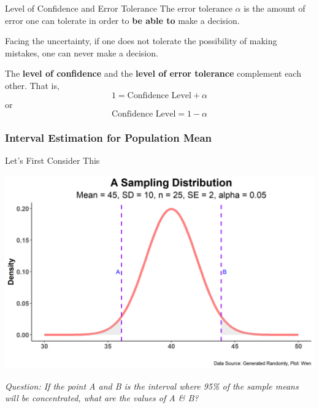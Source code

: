 \documentclass{beamer}
\begin{document}
\begin{frame}{Level of Confidence and Error Tolerance}
The error tolerance $\alpha$ is the amount of error one can tolerate in order to \textbf{be able to} make a decision.

\vspace{0.3 cm}
Facing the uncertainty, if one does not tolerate the possibility of making mistakes, one can never make a decision.

\vspace{0.3 cm}
The \textbf{level of confidence} and the \textbf{level of error tolerance} complement each other. That is, 
$$ 1 = \text{Confidence Level} + \alpha $$
or 
$$ \text{Confidence Level} = 1 - \alpha $$

\end{frame}


\subsubsection{Interval Estimation for Population Mean}
\begin{frame}{Let's First Consider This }


\begin{center}
\includegraphics[scale=0.5]{images/normalDistAreaSamplingDistMean45SE2.png}
\end{center}

\textit{Question: If the point A and B is the interval where 95\% of the sample means will be concentrated, what are the values of A \& B? }

\end{frame}
\end{document}
